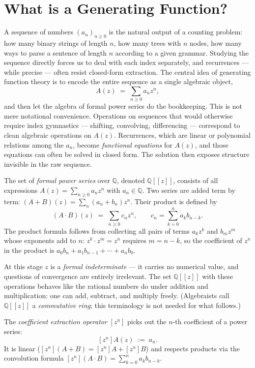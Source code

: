 \chapter{What is a Generating Function?}

A sequence of numbers $(a_n)_{n \ge 0}$ is the natural output of a counting problem: how many binary strings of length $n$, how many trees with $n$ nodes, how many ways to parse a sentence of length $n$ according to a given grammar. Studying the sequence directly forces us to deal with each index separately, and recurrences --- while precise --- often resist closed-form extraction. The central idea of generating function theory is to encode the entire sequence as a single algebraic object,
\[
  A(z) \;=\; \sum_{n \ge 0} a_n z^n,
\]
and then let the algebra of formal power series do the bookkeeping. This is not mere notational convenience. Operations on sequences that would otherwise require index gymnastics --- shifting, convolving, differencing --- correspond to clean algebraic operations on $A(z)$. Recurrences, which are linear or polynomial relations among the $a_n$, become \emph{functional equations} for $A(z)$, and those equations can often be solved in closed form. The solution then exposes structure invisible in the raw sequence.

\begin{definition}
The set of \emph{formal power series} over $\mathbb{Q}$, denoted $\mathbb{Q}[[z]]$, consists of all expressions $A(z) = \sum_{n \ge 0} a_n z^n$ with $a_n \in \mathbb{Q}$. Two series are added term by term: $(A+B)(z) = \sum_n (a_n + b_n) z^n$. Their product is defined by
\[
  (A \cdot B)(z) \;=\; \sum_{n \ge 0} c_n z^n, \qquad c_n = \sum_{k=0}^{n} a_k b_{n-k}.
\]
The product formula follows from collecting all pairs of terms $a_k z^k$ and $b_m z^m$ whose exponents add to $n$: $z^k \cdot z^m = z^n$ requires $m = n-k$, so the coefficient of $z^n$ in the product is $a_0 b_n + a_1 b_{n-1} + \cdots + a_n b_0$.
\end{definition}

At this stage $z$ is a \emph{formal indeterminate} --- it carries no numerical value, and questions of convergence are entirely irrelevant. The set $\mathbb{Q}[[z]]$ with these operations behaves like the rational numbers do under addition and multiplication: one can add, subtract, and multiply freely. (Algebraists call $\mathbb{Q}[[z]]$ a \emph{commutative ring}; this terminology is not needed for what follows.)

\begin{definition}
The \emph{coefficient extraction operator} $[z^n]$ picks out the $n$-th coefficient of a power series:
\[
  [z^n] A(z) \;:=\; a_n.
\]
It is linear ($[z^n](A+B) = [z^n]A + [z^n]B$) and respects products via the convolution formula $[z^n](A \cdot B) = \sum_{k=0}^{n} a_k b_{n-k}$.
\end{definition}

